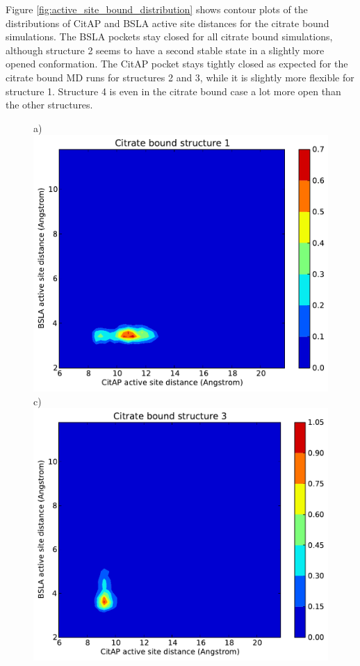 \documentclass[english, a4paper, 12pt, titlepage, draft]{article}
\begin{document}
Figure \ref{fig:active_site_bound_distribution} shows contour plots of the distributions of CitAP and BSLA active site distances for the citrate bound simulations.
The BSLA pockets stay closed for all citrate bound simulations, although structure 2 seems to have a second stable state in a slightly more opened conformation.
The CitAP pocket stays tightly closed as expected for the citrate bound MD runs for structures 2 and 3, while it is slightly more flexible for structure 1.
Structure 4 is even in the citrate bound case a lot more open than the other structures.
 



\begin{figure}
    \begin{minipage}[]{0.45\linewidth}
        \centering
        a)
        \includegraphics[width=\textwidth]{figures/CitAP_BSLA_distance/BSLA_CitAP_distance_bound_contour_structure1.pdf}  
        c)
        \includegraphics[width=\textwidth]{figures/CitAP_BSLA_distance/BSLA_CitAP_distance_bound_contour_structure3.pdf}  

\end{minipage}
\end{figure}
\end{document}
